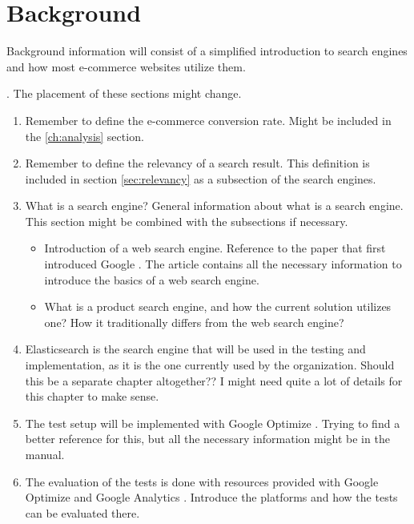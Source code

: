 

\chapter{Background}
\label{ch:background}

Background information will consist of a simplified introduction to search engines and 
how most e-commerce websites utilize them. 

.
The placement of these sections might change.
\begin{enumerate}
    \item Remember to define the e-commerce conversion rate. Might be included in the \ref{ch:analysis} section.
    
    \item Remember to define the relevancy of a search result. This definition is included in section \ref{sec:relevancy} as a subsection of the search engines.

    \item What is a search engine? 
    General information about what is a search engine. 
    This section might be combined with the subsections if necessary.
    
    \begin{itemize}
        \item Introduction of a web search engine. Reference to the paper that first introduced Google \cite{googleInit}. 
        The article contains all the necessary information to introduce the basics of a web search engine.
    
        \item What is a product search engine, and how the current solution utilizes one? 
        How it traditionally differs from the web search engine?
        
    \end{itemize}

    \item Elasticsearch \cite{elasticIntro, relevantSearch} is the search engine that will be used in the testing and implementation, 
    as it is the one currently used by the organization.
    Should this be a separate chapter altogether?? I might need quite a lot of details for this chapter to make sense.
    
    \item The test setup will be implemented with Google Optimize \cite{optimizeAbout}. 
    Trying to find a better reference for this, but all the necessary information might be in the manual.
    
    \item The evaluation of the tests is done with resources provided with Google Optimize and Google Analytics \cite{optimizeAbout, analyticsAbout}. 
    Introduce the platforms and how the tests can be evaluated there.
    
\end{enumerate}

